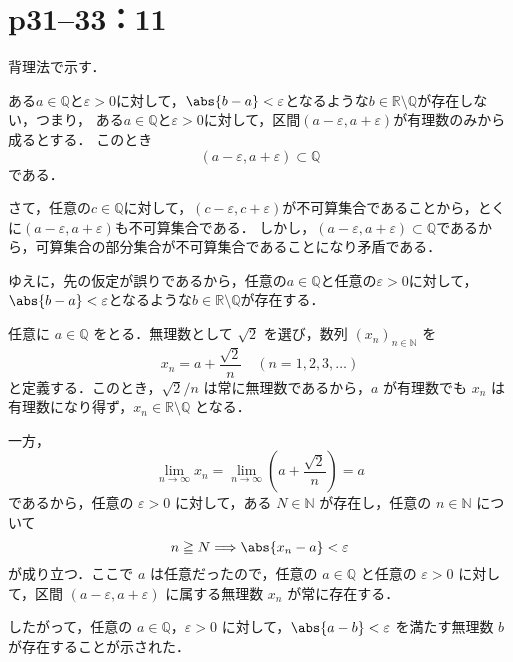 \section*{p31--33：11}

\begin{tproof}
    背理法で示す．

    ある$ a\in \mathbb{Q}$と$\varepsilon >0$に対して，$\abs{b-a}<\varepsilon$となるような$b \in \mathbb{R} \setminus \mathbb{Q}$が存在しない，つまり，
    ある$a \in \mathbb{Q}$と$\varepsilon >0$に対して，区間$(a-\varepsilon , a+ \varepsilon)$が有理数のみから成るとする．
    このとき
    \[
        (a-\varepsilon , a+ \varepsilon) \subset \mathbb{Q}
    \]
    である．

    さて，任意の$ c \in \mathbb{Q}$に対して，$ (c-\varepsilon , c+ \varepsilon)$が不可算集合であることから，とくに$(a-\varepsilon , a+ \varepsilon)$も不可算集合である．
    しかし，$(a-\varepsilon , a+ \varepsilon) \subset \mathbb{Q}$であるから，可算集合の部分集合が不可算集合であることになり矛盾である．

    ゆえに，先の仮定が誤りであるから，任意の$ a\in \mathbb{Q}$と任意の$\varepsilon >0$に対して，$\abs{b-a}<\varepsilon$となるような$b \in \mathbb{R} \setminus \mathbb{Q}$が存在する．
\end{tproof}


\begin{tproof}[別解1]
    任意に $a \in \mathbb{Q}$ をとる．無理数として $\sqrt{2}$ を選び，数列 $(x_n)_{n \in \mathbb{N}}$ を
    \[
        x_n = a + \frac{\sqrt{2}}{n}\quad (n=1,2,3,\dots)
    \]
    と定義する．このとき，$\sqrt{2}/n$ は常に無理数であるから，$a$ が有理数でも $x_n$ は有理数になり得ず，$x_n \in \mathbb{R}\setminus\mathbb{Q}$ となる．

    一方，
    \[
        \lim_{n \to \infty} x_n=\lim_{n \to \infty} \left(a + \frac{\sqrt{2}}{n}\right)=a
    \]
    であるから，任意の $\varepsilon > 0$ に対して，ある $N \in \mathbb{N}$ が存在し，任意の $n \in \mathbb{N}$ について
    \[
        n \geqq N \Longrightarrow \abs{x_n - a} < \varepsilon
    \]
    が成り立つ．ここで $a$ は任意だったので，任意の $a \in \mathbb{Q}$ と任意の $\varepsilon > 0$ に対して，区間 $(a-\varepsilon, a+\varepsilon)$ に属する無理数 $x_n$ が常に存在する．

    したがって，任意の $a \in \mathbb{Q}$，$\varepsilon > 0$ に対して，$\abs{a-b}<\varepsilon$ を満たす無理数 $b$ が存在することが示された．
\end{tproof}


